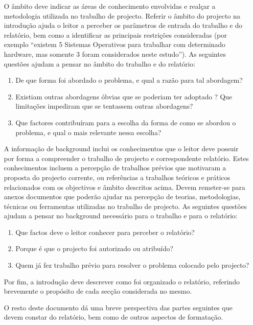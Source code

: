 O âmbito deve indicar as áreas de conhecimento envolvidas e realçar a metodologia utilizada no trabalho de projecto. Referir o âmbito do projecto na introdução ajuda o leitor a perceber os parâmetros de entrada do trabalho e do relatório, bem como a identificar as principais restrições consideradas (por exemplo “existem 5 Sistemas Operativos para trabalhar com determinado hardware, mas somente 3 foram considerados neste estudo”). As seguintes questões ajudam a pensar no âmbito do trabalho e do relatório:

\begin{enumerate}
 \item De que forma foi abordado o problema, e qual a razão para tal abordagem?
 \item Existiam outras abordagens óbvias que se poderiam ter adoptado ? Que limitações impediram que se tentassem outras abordagens?
 \item Que factores contribuíram para a escolha da forma de como se abordou o problema, e qual o mais relevante nessa escolha?
\end{enumerate}

A informação de background inclui os conhecimentos que o leitor deve possuir por forma a compreender o trabalho de projecto e correspondente relatório. Estes conhecimentos incluem a percepção de trabalhos prévios que motivaram a proposta do projecto corrente, ou referências a trabalhos teóricos e práticos relacionados com os objectivos e âmbito descritos acima. Devem remeter-se para anexos documentos que poderão ajudar na percepção de teorias, metodologias, técnicas ou ferramentas utilizadas no trabalho de projecto. As seguintes questões ajudam a pensar no background necessário para o trabalho e para o relatório:

\begin{enumerate}
 \item Que factos deve o leitor conhecer para perceber o relatório?
 \item Porque é que o projecto foi autorizado ou atribuído?
 \item Quem já fez trabalho prévio para resolver o problema colocado pelo projecto?
\end{enumerate}

Por fim, a introdução deve descrever como foi organizado o relatório, referindo brevemente o propósito de cada secção considerada no mesmo.

O resto deste documento dá uma breve perspectiva das partes seguintes que devem constar do relatório, bem como de outros aspectos de formatação.